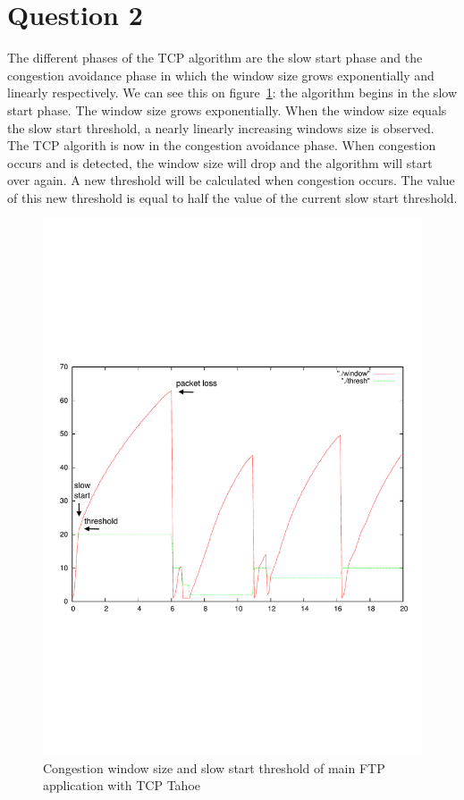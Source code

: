\documentclass[a4paper]{report}
\begin{document}
\section*{Question 2}
The different phases of the TCP algorithm are the slow start phase and the congestion avoidance phase in which the window size grows exponentially and linearly respectively. We can see this on figure~\ref{ex2:question2}: the algorithm begins in the slow start phase. The window size grows exponentially. When the window size equals the slow start threshold, a nearly linearly increasing windows size is observed. The TCP algorith is now in the congestion avoidance phase. When congestion occurs and is detected, the window size will drop and the algorithm will start over again. A new threshold will be calculated when congestion occurs. The value of this new threshold is equal to half the value of the current slow start threshold.
\begin{figure}[h]
\centerline{\includegraphics[scale = 0.6]{pictures/test.pdf}}
\caption{Congestion window size and slow start threshold of main FTP application with TCP Tahoe}
\label{ex2:question2}
\end{figure}
\end{document}
